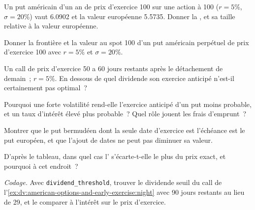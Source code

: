 \begin{exercise}[$\star$]\label{exo:dv:american-options-and-early-exercise:1}
Un put américain d'un an de prix d'exercice 100 sur une action à 100 ($r=5\%$, $\sigma=20\%$) vaut
6.0902 et la valeur européenne 5.5735. Donner la , et sa taille relative
à la valeur européenne.
\end{exercise}

\begin{exercise}[$\star$]\label{exo:dv:american-options-and-early-exercise:2}
Donner la frontière et la valeur au spot 100 d'un put américain perpétuel de prix d'exercice 100 avec
$r=5\%$ et $\sigma=20\%$.
\end{exercise}

\begin{exercise}[$\star$]\label{exo:dv:american-options-and-early-exercise:3}
Un call de prix d'exercice 50 a 60 jours restants après le détachement de demain~; $r=5\%$. En dessous de quel dividende
son exercice anticipé n'est-il certainement pas optimal~?
\end{exercise}

\begin{exercise}[$\star\star$]\label{exo:dv:american-options-and-early-exercise:4}
Pourquoi une forte volatilité rend-elle l'exercice anticipé d'un put moins probable, et un taux
d'intérêt élevé plus probable~? Quel rôle jouent les frais d'emprunt~?
\end{exercise}

\begin{exercise}[$\star\star$]\label{exo:dv:american-options-and-early-exercise:5}
Montrer que le put bermudéen dont la seule date d'exercice est l'échéance est le put européen, et que
l'ajout de dates ne peut pas diminuer sa valeur.
\end{exercise}

\begin{exercise}[$\star\star$]\label{exo:dv:american-options-and-early-exercise:6}
D'après le tableau, dans quel cas l' s'écarte-t-elle le plus du prix exact, et pourquoi à cet endroit~?
\end{exercise}

\begin{exercise}[$\star\star\star$]\label{exo:dv:american-options-and-early-exercise:7}
\emph{Codage.} Avec \texttt{dividend\_threshold}, trouver le dividende seuil du call de
l'\cref{ex:dv:american-options-and-early-exercise:night} avec 90 jours restants au lieu de 29, et
le comparer à l'intérêt sur le prix d'exercice.
\end{exercise}

